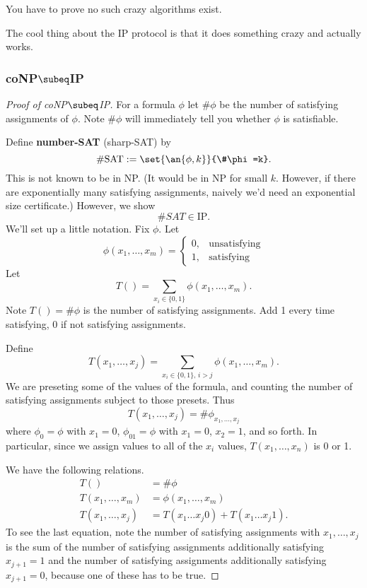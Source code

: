 You have to prove no such crazy algorithms exist.

The cool thing about the IP protocol is that it does something crazy and actually works. %

\subsubsection{coNP$\subeq$IP}
\begin{proof}[Proof of coNP$\subeq$IP]
For a formula $\phi$ let $\#\phi$ be the number of satisfying assignments of $\phi$.
Note $\#\phi$ will immediately tell you whether $\phi$ is satisfiable.

Define \textbf{number-SAT} (sharp-SAT) by
\[
\#\text{SAT}:=\set{\an{\phi,k}}{\#\phi=k}.
\]
This is not known to be in NP. (It would be in NP for small $k$. However, if there are exponentially many satisfying assignments, naively we'd need an exponential size certificate.) However, we show
\[
\#SAT\in \text{IP}.
\]
We'll set up a little notation. Fix $\phi$. Let 
\[
\phi(x_1,\ldots, x_m)=\begin{cases}
0,&\text{unsatisfying}\\
1,&\text{satisfying}
\end{cases}
\]
Let
\[
T()=\sum_{x_i\in \{0,1\}}\phi(x_1,\ldots, x_m).
\]
Note $T()=\#\phi$ is the number of satisfying assignments. Add 1 every time satisfying, 0 if not satisfying assignments.

Define
\[
T(x_1,\ldots, x_j)=\sum_{x_i\in \{0,1\},\,i>j} \phi(x_1,\ldots, x_m).
\]
We are preseting some of the values of the formula, and counting the number of satisfying assignments subject to those presets. Thus
\[
T(x_1,\ldots, x_j)=\#\phi_{x_1,\ldots, x_j}
\]
where $\phi_0=\phi$ with $x_1=0$, $\phi_{01}=\phi$ with $x_1=0$, $x_2=1$, and so forth.
In particular, since we assign values to all of the $x_i$ values, $T(x_1,\ldots, x_n)$ is 0 or 1.

We have the following relations.
\begin{align*}
T()&=\#\phi\\
T(x_1,\ldots, x_m)&=\phi(x_1,\ldots, x_m)\\
T(x_1,\ldots, x_j)&=T(x_1\ldots x_j0)+T(x_1\ldots x_j1).
\end{align*}
To see the last equation, note the number of satisfying assignments with $x_1,\ldots, x_j$ is the sum of the number of satisfying assignments additionally satisfying  $x_{j+1}=1$ and the number of satisfying assignments additionally satisfying $x_{j+1}=0$, because one of these has to be true.


\end{proof}
